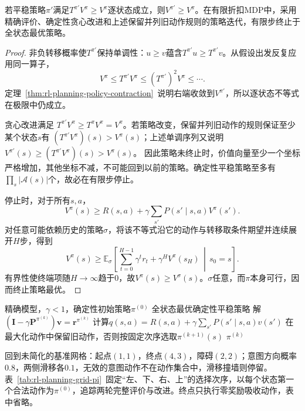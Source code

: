\begin{theorem}[策略改进及策略迭代的有限终止]
 \label{thm:rl-planning-policy-improvement}
 若平稳策略$\pi'$满足$T^{\pi'}V^\pi\geq V^\pi$逐状态成立，则$V^{\pi'}\geq V^\pi$。在有限折扣MDP中，采用精确评价、确定性贪心改进和上述保留并列旧动作规则的策略迭代，有限步终止于全状态最优策略。
\end{theorem}
\begin{proof}
 非负转移概率使$T^{\pi'}$保持单调性：$u\geq v$蕴含$T^{\pi'}u\geq T^{\pi'}v$。从假设出发反复应用同一算子，
 \[
 V^\pi\leq T^{\pi'}V^\pi
 \leq (T^{\pi'})^2V^\pi\leq\cdots.
 \]
 定理~\ref{thm:rl-planning-policy-contraction}~说明右端收敛到$V^{\pi'}$，所以逐状态不等式在极限中仍成立。

 贪心改进满足
 $T^{\pi'}V^\pi\geq T^\pi V^\pi=V^\pi$。若策略改变，保留并列旧动作的规则保证至少某个状态$s$有
 $(T^{\pi'}V^\pi)(s)>V^\pi(s)$；上述单调序列又说明
 $V^{\pi'}(s)\geq(T^{\pi'}V^\pi)(s)>V^\pi(s)$。
 因此策略未终止时，价值向量至少一个坐标严格增加，其他坐标不减，不可能回到以前的策略。确定性平稳策略至多有$\prod_s|\mathcal A(s)|$个，故必在有限步停止。

 停止时，对于所有$s,a$，
 \[
 V^\pi(s)\geq R(s,a)+\gamma\sum_{s'}P(s'\mid s,a)V^\pi(s').
 \]
 对任意可能依赖历史的策略$\sigma$，将该不等式沿它的动作与转移取条件期望并连续展开$H$步，得到
 \[
 V^\pi(s)\geq
 \mathbb E_\sigma\!\left[
 \sum_{t=0}^{H-1}\gamma^t r_t+\gamma^H V^\pi(s_H)
 \,\middle|\,s_0=s\right].
 \]
 有界性使终端项随$H\to\infty$趋于0，故$V^\pi(s)\geq V^\sigma(s)$。$\sigma$任意，而$\pi$本身可行，因而终止策略最优。
\end{proof}

\begin{algorithm}[精确策略迭代]
 \label{alg:rl-planning-policy-iteration}
 \begin{algorithmic}[1]
  \Require 精确模型，$\gamma<1$，确定性初始策略$\pi^{(0)}$
  \Ensure 全状态最优确定性平稳策略
   \State 解$(\bm I-\gamma\bm P^{\pi^{(k)}})\bm v=\bm r^{\pi^{(k)}}$
    \State 计算$q(s,a)=R(s,a)+\gamma\sum_{s'}P(s'\mid s,a)v(s')$
    \State 在最大化动作中保留旧动作，否则按固定次序选取$\pi^{(k+1)}(s)$
   \EndFor
    \State \Return $\pi^{(k)}$
   \EndIf
  \EndFor
 \end{algorithmic}
\end{algorithm}

回到未简化的基准网格：起点$(1,1)$，终点$(4,3)$，障碍$(2,2)$；意图方向概率$0.8$，两侧滑移各$0.1$，无效的意图动作不在动作集合中，滑移撞墙则停留。表~\ref{tab:rl-planning-grid-pi}~固定“左、下、右、上”的选择次序，以每个状态第一个合法动作为$\pi^{(0)}$，追踪两轮完整评价与改进。终点只执行零奖励吸收动作，表中省略。

